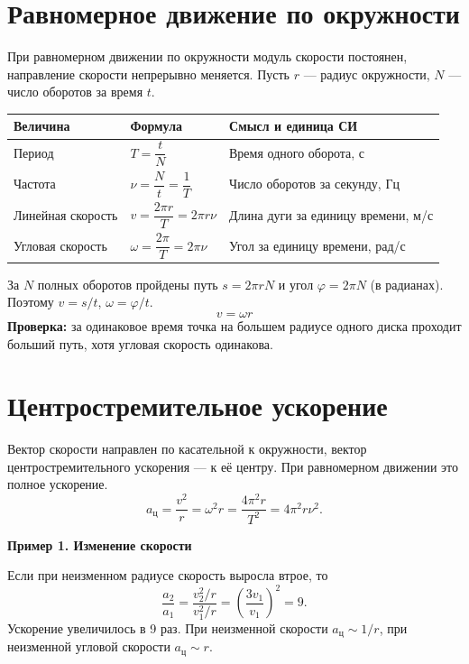 \documentclass[a4paper,12pt]{article}
\newcommand{\key}[1]{\textcolor{darkaccent}{\textbf{#1}}}
\newcommand{\ex}[1]{\par\medskip\textbf{#1}\par}
\begin{document}
\section{Равномерное движение по окружности}
При равномерном движении по окружности модуль скорости постоянен, направление скорости непрерывно меняется. Пусть $r$ --- радиус окружности, $N$ --- число оборотов за время $t$.
\begin{center}
\end{center}
\begin{center}
\renewcommand{\arraystretch}{1.25}
\begin{tabularx}{\linewidth}{@{}l l X@{}}
\toprule Величина & Формула & Смысл и единица СИ\\\midrule
Период & $T=\dfrac{t}{N}$ & Время одного оборота, с\\
Частота & $\nu=\dfrac{N}{t}=\dfrac1T$ & Число оборотов за секунду, Гц\\
Линейная скорость & $v=\dfrac{2\pi r}{T}=2\pi r\nu$ & Длина дуги за единицу времени, м/с\\
Угловая скорость & $\omega=\dfrac{2\pi}{T}=2\pi\nu$ & Угол за единицу времени, рад/с\\
\bottomrule
\end{tabularx}
\end{center}
За $N$ полных оборотов пройдены путь $s=2\pi rN$ и угол $\varphi=2\pi N$ (в радианах). Поэтому $v=s/t$, $\omega=\varphi/t$.
\[\boxed{v=\omega r}\]
\key{Проверка:} за одинаковое время точка на большем радиусе одного диска проходит больший путь, хотя угловая скорость одинакова.
\clearpage
\section{Центростремительное ускорение}
Вектор скорости направлен по касательной к окружности, вектор центростремительного ускорения --- к её центру. При равномерном движении это полное ускорение.
\[
 a_{\text{ц}}=\frac{v^2}{r}=\omega^2r
 =\frac{4\pi^2r}{T^2}=4\pi^2r\nu^2.
\]
\ex{Пример 1. Изменение скорости}
Если при неизменном радиусе скорость выросла втрое, то
\[\frac{a_2}{a_1}=\frac{v_2^2/r}{v_1^2/r}=\left(\frac{3v_1}{v_1}\right)^2=9.\]
Ускорение увеличилось в 9 раз. При неизменной скорости $a_{\text{ц}}\sim 1/r$, при неизменной угловой скорости $a_{\text{ц}}\sim r$.
\end{document}
